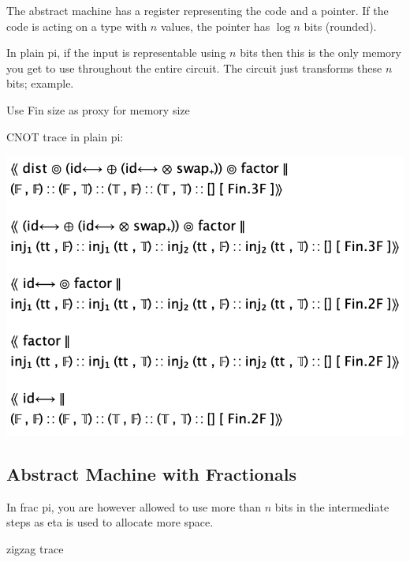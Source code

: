 \documentclass[sigplan,10pt,review,anonymous]{acmart}
\begin{document}
The abstract machine has a register representing the code and a
pointer. If the code is acting on a type with $n$ values, the pointer
has $\log{n}$ bits (rounded).

In plain pi, if the input is representable using $n$ bits then this is
the only memory you get to use throughout the entire circuit. The
circuit just transforms these $n$ bits; example.

Use Fin size as proxy for memory size

\PIFMEMsize{}

\PIMEMcardeq{}

\PIMEMstep{}

CNOT trace in plain pi: 

\includegraphics[scale=0.4]{trace1.png}


\subsection{Abstract Machine with Fractionals}

In frac pi, you are however allowed to use more than $n$ bits in the
intermediate steps as eta is used to allocate more space.

\PIFMEMstep{}

zigzag trace
\end{document}
